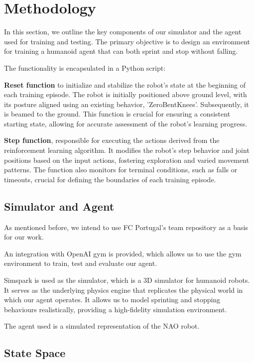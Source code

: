 \documentclass[conference]{IEEEtran}
\begin{document}
\section{Methodology}\label{Methodology}

In this section, we outline the key components of our simulator and the agent used for training and testing.
The primary objective is to design an environment for training a humanoid agent that can both sprint and stop without falling.

The functionality is encapsulated in a Python script:

\textbf{Reset function} to initialize and stabilize the robot's state at the beginning of each training episode.
The robot is initially positioned above ground level, with its posture aligned using an existing behavior, 'Zero\textunderscore Bent\textunderscore Knees'. Subsequently, it is beamed to the ground.
This function is crucial for ensuring a consistent starting state, allowing for accurate assessment of the robot's learning progress.


\textbf{Step function}, responsible for executing the actions derived from the reinforcement learning algorithm.
It modifies the robot's step behavior and joint positions based on the input actions, fostering exploration and varied movement patterns. The function also monitors for terminal conditions, such as falls or timeouts, crucial for defining the boundaries of each training episode.

\subsection{Simulator and Agent}\label{Simulator and Agent}

As mentioned before, we intend to use FC Portugal's team repository as a basis for our work.

An integration with OpenAI gym is provided, which allows us to use the gym environment to train, test and evaluate our agent.

Simspark is used as the simulator, which is a 3D simulator for humanoid robots. It serves as the underlying physics engine that replicates the physical world in which our agent operates.
It allows us to model sprinting and stopping behaviours realistically, providing a high-fidelity simulation environment.

The agent used is a simulated representation of the NAO robot.

\subsection{State Space}\label{State Space}
\end{document}
